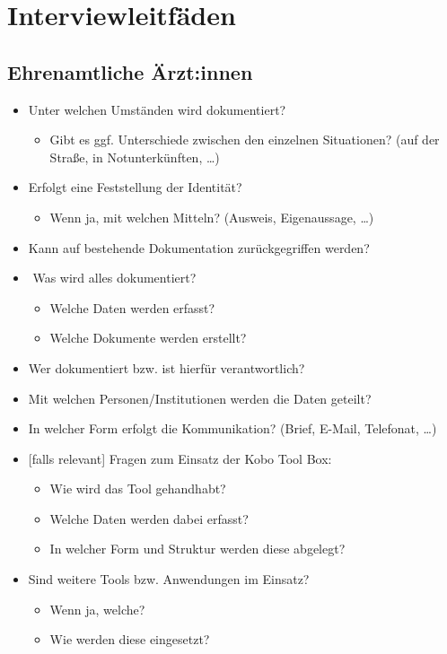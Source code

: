 \chapter{Interviewleitfäden}\label{ch:interviews}

\section{Ehrenamtliche Ärzt:innen}

\begin{itemize}
	\item Unter welchen Umständen wird dokumentiert?
	\begin{itemize}
		\item Gibt es ggf. Unterschiede zwischen den einzelnen Situationen? (auf der Straße, in Notunterkünften, …)
	\end{itemize}
	\item Erfolgt eine Feststellung der Identität?
	\begin{itemize}
		\item Wenn ja, mit welchen Mitteln? (Ausweis, Eigenaussage, …)
	\end{itemize}
	\item Kann auf bestehende Dokumentation zurückgegriffen werden?
	\item ­	Was wird alles dokumentiert?
	\begin{itemize}
		\item Welche Daten werden erfasst?
		\item Welche Dokumente werden erstellt?
	\end{itemize}
	\item Wer dokumentiert bzw. ist hierfür verantwortlich?
	\item Mit welchen Personen/Institutionen werden die Daten geteilt?
	\item In welcher Form erfolgt die Kommunikation? (Brief, E-Mail, Telefonat, …)
	\item {}[falls relevant] Fragen zum Einsatz der Kobo Tool Box:
	\begin{itemize}
		\item Wie wird das Tool gehandhabt?
		\item Welche Daten werden dabei erfasst?
		\item In welcher Form und Struktur werden diese abgelegt?
	\end{itemize}
	\item Sind weitere Tools bzw. Anwendungen im Einsatz?
	\begin{itemize}
		\item Wenn ja, welche?
		\item Wie werden diese eingesetzt?
	\end{itemize}
\end{itemize}

